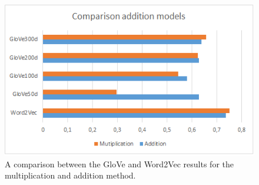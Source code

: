 \begin{figure}[H]
	\centering
	\includegraphics[width=130mm]{images/chart1.png}
	\caption{A comparison between the GloVe and Word2Vec results for the multiplication and addition method.}
	\label{fig:gloveword2veccomparison}
\end{figure}